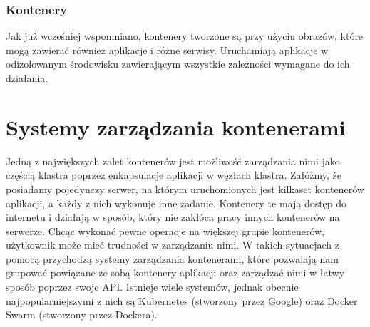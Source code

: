 \documentclass[12pt]{report}
\let\Oldsection\section
\renewcommand{\section}{\FloatBarrier\Oldsection}
\let\Oldsubsubsection\subsubsection
\renewcommand{\subsubsection}{\FloatBarrier\Oldsubsubsection}
\begin{document}
\subsubsection{Kontenery}
Jak już wcześniej wspomniano, kontenery tworzone są przy użyciu obrazów, które mogą zawierać również aplikacje i różne serwisy. Uruchamiają aplikacje w odizolowanym środowisku zawierającym wszystkie zależności wymagane do ich działania. 

\section{Systemy zarządzania kontenerami}
Jedną z największych zalet kontenerów jest możliwość zarządzania nimi jako częścią klastra poprzez enkapsulacje aplikacji w węzłach klastra. Załóżmy, że posiadamy pojedynczy serwer, na którym uruchomionych jest kilkaset kontenerów aplikacji, a każdy z nich wykonuje inne zadanie. Kontenery te mają dostęp do internetu i działają w sposób, który nie zakłóca pracy innych kontenerów na serwerze. Chcąc wykonać pewne operacje na większej grupie kontenerów, użytkownik może mieć trudności w zarządzaniu nimi. W takich sytuacjach z pomocą przychodzą systemy zarządzania kontenerami, które pozwalają nam grupować powiązane ze sobą kontenery aplikacji oraz zarządzać nimi w łatwy sposób poprzez swoje API. Istnieje wiele systemów, jednak obecnie najpopularniejszymi z nich są Kubernetes (stworzony przez Google) oraz Docker Swarm (stworzony przez Dockera).
\end{document}
